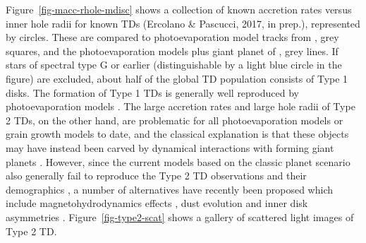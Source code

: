 \documentclass[10pt,fleqn,twoside]{article}
\begin{document}
Figure~\ref{fig-macc-rhole-mdisc} shows a collection of known accretion rates versus inner hole
radii for known TDs (Ercolano \& Pascucci, 2017, in prep.),
represented by circles. These are compared to photoevaporation model tracks from
\citet{2011MNRAS.412...13O}, grey squares, and the photoevaporation models plus giant planet
of \citet{2013MNRAS.430.1392R, 2015MNRAS.454.2173R}, grey lines. 
If stars of spectral type G or earlier (distinguishable by a light
blue circle in the figure) are excluded, about half of the global TD population consists of Type 1
disks. The formation of Type 1 TDs is generally well reproduced by
photoevaporation models \citep[e.g.,][]{2010MNRAS.401.1415O, 2011MNRAS.412...13O}.
The large accretion rates and large hole
radii of Type 2 TDs, on the other hand, are problematic for all 
photoevaporation models \citep[e.g.,][]{2013MNRAS.430.1392R, 2015MNRAS.454.2173R}
or grain
growth models \citep{2012A&A...544A..79B} to date, and the classical explanation is that
these objects may have instead been carved by dynamical interactions
with forming giant planets \citep[e.g.,][]{2011ApJ...729...47Z}. However, since the
current models based on the classic planet scenario also generally
fail to reproduce the Type 2 TD observations and 
their demographics \citep[see e.g.,][]{2016ApJ...825...77D},
a number of alternatives have recently been proposed which include magnetohydrodynamics
effects \citep[e.e.,][]{2016arXiv160907510W}, dust evolution 
\citep{2016A&A...585A..35P} and inner disk asymmetries \citep{2016ApJ...823L...8M}.
Figure~\ref{fig-type2-scat} shows a gallery of scattered light images of Type 2 TD.
\end{document}
